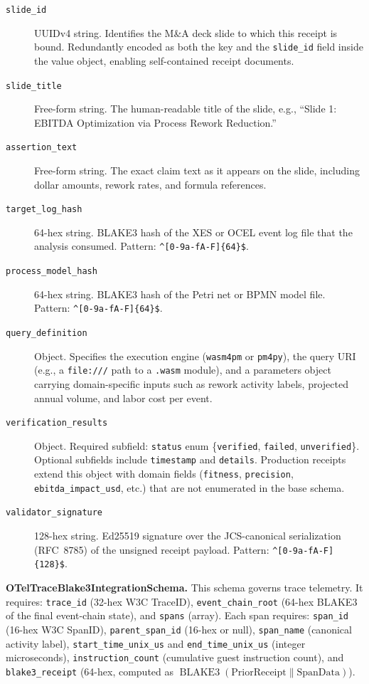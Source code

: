 \begin{description}
  \item[\texttt{slide\_id}] UUIDv4 string. Identifies the M\&A deck slide to which this receipt
    is bound. Redundantly encoded as both the key and the \texttt{slide\_id} field inside the value
    object, enabling self-contained receipt documents.
  \item[\texttt{slide\_title}] Free-form string. The human-readable title of the slide, e.g.,
    ``Slide 1: EBITDA Optimization via Process Rework Reduction.''
  \item[\texttt{assertion\_text}] Free-form string. The exact claim text as it appears on the slide,
    including dollar amounts, rework rates, and formula references.
  \item[\texttt{target\_log\_hash}] 64-hex string. BLAKE3 hash of the XES or OCEL event log file
    that the analysis consumed. Pattern: \verb|^[0-9a-fA-F]{64}$|.
  \item[\texttt{process\_model\_hash}] 64-hex string. BLAKE3 hash of the Petri net or BPMN model
    file. Pattern: \verb|^[0-9a-fA-F]{64}$|.
  \item[\texttt{query\_definition}] Object. Specifies the execution engine (\texttt{wasm4pm} or
    \texttt{pm4py}), the query URI (e.g., a \texttt{file:///} path to a \texttt{.wasm} module),
    and a parameters object carrying domain-specific inputs such as rework activity labels,
    projected annual volume, and labor cost per event.
  \item[\texttt{verification\_results}] Object. Required subfield: \texttt{status} enum
    \{\texttt{verified}, \texttt{failed}, \texttt{unverified}\}. Optional subfields include
    \texttt{timestamp} and \texttt{details}. Production receipts extend this object with domain
    fields (\texttt{fitness}, \texttt{precision}, \texttt{ebitda\_impact\_usd}, etc.) that are
    not enumerated in the base schema.
  \item[\texttt{validator\_signature}] 128-hex string. Ed25519 signature over the JCS-canonical
    serialization (RFC~8785) of the unsigned receipt payload. Pattern: \verb|^[0-9a-fA-F]{128}$|.
\end{description}

\textbf{OTelTraceBlake3IntegrationSchema.} This schema governs trace telemetry. It requires:
\texttt{trace\_id} (32-hex W3C TraceID), \texttt{event\_chain\_root} (64-hex BLAKE3 of the
final event-chain state), and \texttt{spans} (array). Each span requires: \texttt{span\_id}
(16-hex W3C SpanID), \texttt{parent\_span\_id} (16-hex or null), \texttt{span\_name} (canonical
activity label), \texttt{start\_time\_unix\_us} and \texttt{end\_time\_unix\_us} (integer
microseconds), \texttt{instruction\_count} (cumulative guest instruction count), and
\texttt{blake3\_receipt} (64-hex, computed as $\operatorname{BLAKE3}(\text{PriorReceipt} \| \text{SpanData})$).

